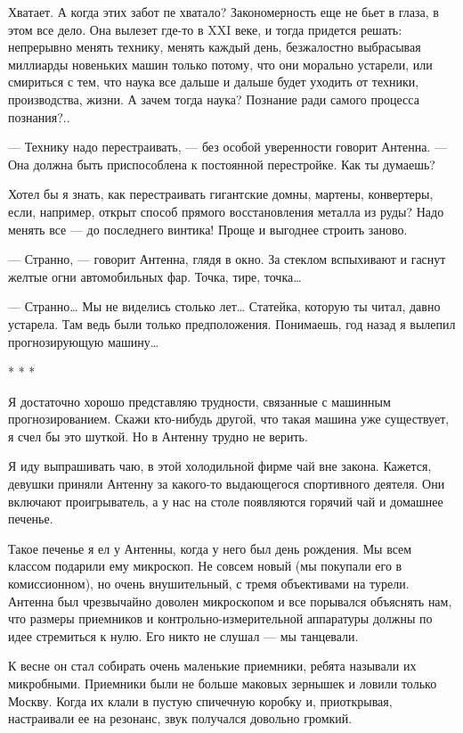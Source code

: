 Хватает. А  когда этих  забот пе  хватало? Закономерность  еще не  бьет  в
глаза, в этом все дело.  Она вылезет где-то в  XXI веке, и тогда  придется
решать:  непрерывно  менять  технику,  менять  каждый  день,   безжалостно
выбрасывая миллиарды  новеньких  машин  только потому,  что  они  морально
устарели, или смириться с тем, что наука все дальше и дальше будет уходить
от техники, производства, жизни. А зачем тогда наука? Познание ради самого
процесса познания?..

— Технику надо перестраивать, — без особой уверенности говорит Антенна.  —
Она должна быть приспособлена к постоянной перестройке. Как ты думаешь?

Хотел бы я знать, как перестраивать гигантские домны, мартены, конвертеры,
если, например, открыт способ прямого восстановления металла из руды? Надо
менять все — до последнего винтика! Проще и выгоднее строить заново.

— Странно, — говорит Антенна, глядя в окно. За стеклом вспыхивают и гаснут
желтые огни автомобильных фар. Точка, тире, точка…

— Странно… Мы не виделись столько  лет… Статейка, которую ты читал,  давно
устарела. Там  ведь  были только  предположения.  Понимаешь, год  назад  я
вылепил прогнозирующую машину…

* * *

Я  достаточно   хорошо  представляю   трудности,  связанные   с   машинным
прогнозированием.  Скажи   кто-нибудь  другой,   что  такая   машина   уже
существует, я счел бы это шуткой. Но в Антенну трудно не верить.

Я иду выпрашивать чаю, в этой  холодильной фирме чай вне закона.  Кажется,
девушки приняли Антенну за какого-то выдающегося спортивного деятеля.  Они
включают проигрыватель, а у нас на столе появляются горячий чай и домашнее
печенье.

Такое печенье я  ел у Антенны,  когда у  него был день  рождения. Мы  всем
классом подарили  ему  микроскоп.  Не  совсем новый  (мы  покупали  его  в
комиссионном), но  очень  внушительный,  с тремя  объективами  на  турели.
Антенна был чрезвычайно доволен микроскопом и все порывался объяснять нам,
что размеры  приемников и  контрольно-измерительной аппаратуры  должны  по
идее стремиться к нулю. Его никто не слушал — мы танцевали.

К весне он  стал собирать  очень маленькие приемники,  ребята называли  их
микробными. Приемники  были не  больше маковых  зернышек и  ловили  только
Москву.  Когда  их  клали  в  пустую  спичечную  коробку  и,  приоткрывая,
настраивали ее на резонанс, звук получался довольно громкий.

